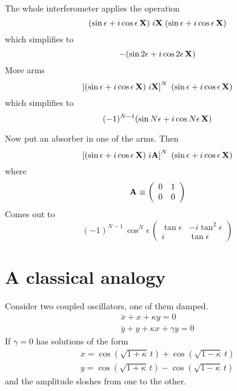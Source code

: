 \documentclass[12pt,aps,prb,preprint]{revtex4}
\def\X{{\bf X}}
\def\A{{\bf A}}
\begin{document}
The whole interferometer applies the operation
\begin{equation}
     (\sin\epsilon + i\cos\epsilon\,\X)
     \; i\X \;
     (\sin\epsilon + i\cos\epsilon\,\X)
\end{equation}
which simplifies to
\begin{equation}
     -(\sin2\epsilon + i\cos2\epsilon\,\X)
\end{equation}
More arms
\begin{equation}
     \left[ (\sin\epsilon + i\cos\epsilon\,\X) \; i\X \right]^N \;
     (\sin\epsilon + i\cos\epsilon\,\X)
\end{equation}
which simplifies to
\begin{equation}
     (-1)^{N-1} (\sin N\epsilon + i\cos N\epsilon\,\X)
\end{equation}

Now put an absorber in one of the arms.  Then
\begin{equation}
     \left[ (\sin\epsilon + i\cos\epsilon\,\X) \; i\A \right]^N \;
     (\sin\epsilon + i\cos\epsilon\,\X)
\end{equation}
where
\begin{equation}
\A \equiv \left( \begin{array}{cc} 0 & 1 \\ 0 & 0 \end{array} \right)
\end{equation}
Comes out to
\begin{equation}
(-1)^{N-1} \, \cos^N\!\epsilon \,
\left( \begin{array}{cc} \tan\epsilon & -i\tan^2\epsilon \\
                         i            & \tan\epsilon 
       \end{array} \right)
\end{equation}

\section{A classical analogy}

Consider two coupled oscillators, one of them damped.
\begin{equation}
\begin{array}{l}
\ddot x + x + \kappa y = 0 \\
\ddot y + y + \kappa x + \gamma y = 0
\end{array}
\end{equation}
If $\gamma=0$ has solutions of the form
\begin{equation}
\begin{array}{l}
x = \cos(\sqrt{1+\kappa}\,t) + \cos(\sqrt{1-\kappa}\,t)  \\
y = \cos(\sqrt{1+\kappa}\,t) - \cos(\sqrt{1-\kappa}\,t)
\end{array}
\end{equation}
and the amplitude sloshes from one to the other.
\end{document}
